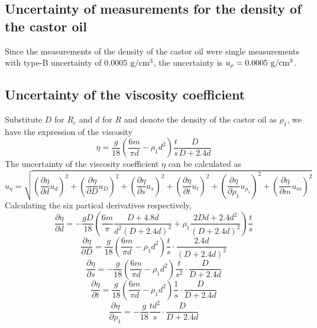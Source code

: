 \documentclass[a4paper]{report}
\begin{document}
	\subsection{Uncertainty of measurements for the density of the castor oil}
	Since the measurements of the density of the castor oil were single measurements with type-B uncertainty of 0.0005 $\rm{g/{cm}^3}$, the uncertainty is $u_{\rho}=0.0005\ \rm{g/{cm}^3}$.
	\subsection{Uncertainty of the viscosity coefficient}
	Substitute $D$ for $R_c$ and $d$ for $R$ and denote the density of the castor oil as $\rho_1$, we have the expression of the viscosity
	\begin{equation*}
	\eta=\dfrac{g}{18}(\dfrac{6m}{\pi d}-\rho_1d^2)\dfrac{t}{s}\dfrac{D}{D+2.4d}
	\end{equation*}
	The uncertainty of the viscosity coefficient $\eta$ can be calculated as
	\begin{equation*}
	u_{\eta}=\sqrt{(\dfrac{\partial\eta}{\partial d}u_d)^2+(\dfrac{\partial\eta}{\partial D}u_D)^2+(\dfrac{\partial\eta}{\partial s}u_s)^2+(\dfrac{\partial\eta}{\partial t}u_t)^2+(\dfrac{\partial\eta}{\partial\rho_1}u_{\rho_1})^2+(\dfrac{\partial\eta}{\partial m}u_m)^2}
	\end{equation*}
	Calculating the six partical derivatives respectively,
	\begin{equation*}
	\dfrac{\partial\eta}{\partial d}=-\dfrac{gD}{18}(\dfrac{6m}{\pi}\dfrac{D+4.8d}{d^2(D+2.4d)^2}+\rho_1\dfrac{2Dd+2.4d^2}{(D+2.4d)^2})\dfrac{t}{s}
	\end{equation*}
	\begin{equation*}
	\dfrac{\partial\eta}{\partial D}=\dfrac{g}{18}(\dfrac{6m}{\pi d}-\rho_1d^2)\dfrac{t}{s}\cdot\dfrac{2.4d}{(D+2.4d)^2}
	\end{equation*}
	\begin{equation*}
	\dfrac{\partial\eta}{\partial s}=-\dfrac{g}{18}(\dfrac{6m}{\pi d}-\rho_1d^2)\dfrac{t}{s^2}\cdot\dfrac{D}{D+2.4d}
	\end{equation*}
	\begin{equation*}
	\dfrac{\partial\eta}{\partial t}=\dfrac{g}{18}(\dfrac{6m}{\pi d}-\rho_1d^2)\dfrac{1}{s}\cdot\dfrac{D}{D+2.4d}
	\end{equation*}
	\begin{equation*}
	\dfrac{\partial\eta}{\partial\rho_1}=-\dfrac{g}{18}\dfrac{td^2}{s}\cdot\dfrac{D}{D+2.4d}
	\end{equation*}
\end{document}
